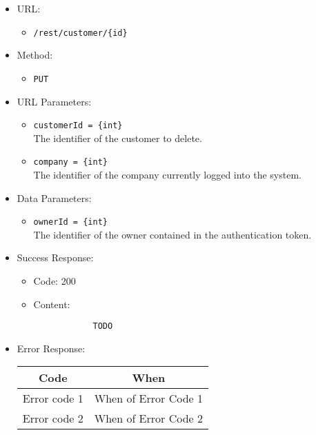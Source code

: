 \begin{itemize}
    
    \item URL: 
    \begin{itemize}
        \item \texttt{/rest/customer/\{id\}}
    \end{itemize}
    
    \item Method: 
    \begin{itemize}
        \item \texttt{PUT}
    \end{itemize}
    
    \item URL Parameters: 
    \begin{itemize}
        \item \texttt{customerId = \{int\}} \\
        The identifier of the customer to delete.
        \item \texttt{company = \{int\}} \\
        The identifier of the company currently logged into the system.
    \end{itemize}
    
    \item Data Parameters: 
    \begin{itemize}
        \item \texttt{ownerId = \{int\}} \\
        The identifier of the owner contained in the authentication token.
    \end{itemize}
    
    \item Success Response: 
    \begin{itemize}
        \item Code: 200
        \item Content:
        \begin{lstlisting}
            TODO
        \end{lstlisting}    
    \end{itemize}
    
    \item Error Response:
    \begin{table}[!h]
    \centering 
    \begin{tabular}{|c|c|}
    \hline
    \multicolumn{1}{|c|}{\textbf{Code}} & \multicolumn{1}{c|}{\textbf{When}} \\ \hline
    Error code 1 & When of Error Code 1 \\\hline
    Error code 2 & When of Error Code 2 \\\hline
    \end{tabular} 
    \end{table} 
    
\end{itemize}

